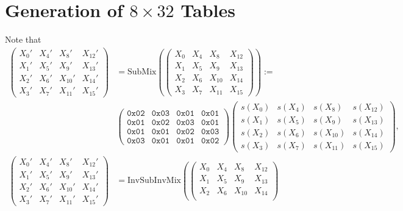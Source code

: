 \newpage
\section{Generation of $8\times 32$ Tables}
Note that \begin{align*}
	\begin{pmatrix}
		X_0' & X_4' & X_8' & X_{12}' \\
		X_1' & X_5' & X_9' & X_{13}' \\
		X_2' & X_6' & X_{10}' & X_{14}' \\
		X_3' & X_7' & X_{11}' & X_{15}'
	\end{pmatrix}&=\text{SubMix}\left(\begin{pmatrix}
		X_0 & X_4 & X_8 & X_{12} \\
		X_1 & X_5 & X_9 & X_{13} \\
		X_2 & X_6 & X_{10} & X_{14} \\
		X_3 & X_7 & X_{11} & X_{15}
	\end{pmatrix}\right):=\\
&\begin{pmatrix}
		\texttt{0x02} & \texttt{0x03} & \texttt{0x01} & \texttt{0x01}\\
		\texttt{0x01} & \texttt{0x02} & \texttt{0x03} & \texttt{0x01}\\
		\texttt{0x01} & \texttt{0x01} & \texttt{0x02} & \texttt{0x03}\\
		\texttt{0x03} & \texttt{0x01} & \texttt{0x01} & \texttt{0x02}
	\end{pmatrix}\begin{pmatrix}
		s(X_0) & s(X_4) & s(X_8) & s(X_{12}) \\
		s(X_1) & s(X_5) & s(X_9) & s(X_{13}) \\
		s(X_2) & s(X_6) & s(X_{10}) & s(X_{14}) \\
		s(X_3) & s(X_7) & s(X_{11}) & s(X_{15})
	\end{pmatrix},\\
\begin{pmatrix}
	X_0' & X_4' & X_8' & X_{12}' \\
	X_1' & X_5' & X_9' & X_{13}' \\
	X_2' & X_6' & X_{10}' & X_{14}' \\
	X_3' & X_7' & X_{11}' & X_{15}'
\end{pmatrix}&=\text{InvSubInvMix}\left(\begin{pmatrix}
	X_0 & X_4 & X_8 & X_{12} \\
	X_1 & X_5 & X_9 & X_{13} \\
	X_2 & X_6 & X_{10} & X_{14} \\

\end{pmatrix}
\end{align*}
